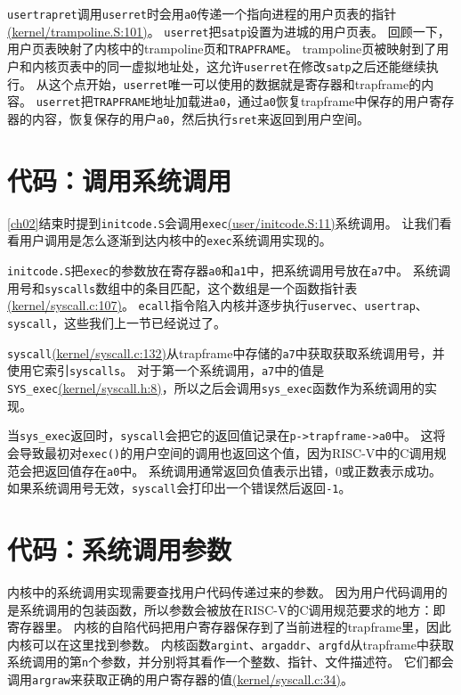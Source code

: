 \texttt{usertrapret}调用\texttt{userret}时会用\texttt{a0}传递一个指向进程的用户页表的指针\href{https://github.com/mit-pdos/xv6-riscv/blob/riscv//kernel/trampoline.S#L101}{(kernel/trampoline.S:101)}。
\texttt{userret}把\texttt{satp}设置为进城的用户页表。
回顾一下，用户页表映射了内核中的trampoline页和\texttt{TRAPFRAME}。
trampoline页被映射到了用户和内核页表中的同一虚拟地址处，这允许\texttt{userret}在修改\texttt{satp}之后还能继续执行。
从这个点开始，\texttt{userret}唯一可以使用的数据就是寄存器和trapframe的内容。
\texttt{userret}把\texttt{TRAPFRAME}地址加载进\texttt{a0}，通过\texttt{a0}恢复trapframe中保存的用户寄存器的内容，恢复保存的用户\texttt{a0}，然后执行\texttt{sret}来返回到用户空间。

\section{代码：调用系统调用}
\autoref{ch02}结束时提到\texttt{initcode.S}会调用\texttt{exec}\href{https://github.com/mit-pdos/xv6-riscv/blob/riscv//user/initcode.S#L11}{(user/initcode.S:11)}系统调用。
让我们看看用户调用是怎么逐渐到达内核中的\texttt{exec}系统调用实现的。

\texttt{initcode.S}把\texttt{exec}的参数放在寄存器\texttt{a0}和\texttt{a1}中，把系统调用号放在\texttt{a7}中。
系统调用号和\texttt{syscalls}数组中的条目匹配，这个数组是一个函数指针表\href{https://github.com/mit-pdos/xv6-riscv/blob/riscv//kernel/syscall.c#L107}{(kernel/syscall.c:107)}。
\texttt{ecall}指令陷入内核并逐步执行\texttt{uservec}、\texttt{usertrap}、\texttt{syscall}，这些我们上一节已经说过了。

\texttt{syscall}\href{https://github.com/mit-pdos/xv6-riscv/blob/riscv//kernel/syscall.c#L132}{(kernel/syscall.c:132)}从trapframe中存储的\texttt{a7}中获取获取系统调用号，并使用它索引\texttt{syscalls}。
对于第一个系统调用，\texttt{a7}中的值是\texttt{SYS\_exec}\href{https://github.com/mit-pdos/xv6-riscv/blob/riscv//kernel/syscall.h#L8}{(kernel/syscall.h:8)}，所以之后会调用\texttt{sys\_exec}函数作为系统调用的实现。

当\texttt{sys\_exec}返回时，\texttt{syscall}会把它的返回值记录在\texttt{p->trapframe->a0}中。
这将会导致最初对\texttt{exec()}的用户空间的调用也返回这个值，因为RISC-V中的C调用规范会把返回值存在\texttt{a0}中。
系统调用通常返回负值表示出错，0或正数表示成功。
如果系统调用号无效，\texttt{syscall}会打印出一个错误然后返回\texttt{-1}。

\section{代码：系统调用参数}
内核中的系统调用实现需要查找用户代码传递过来的参数。
因为用户代码调用的是系统调用的包装函数，所以参数会被放在RISC-V的C调用规范要求的地方：即寄存器里。
内核的自陷代码把用户寄存器保存到了当前进程的trapframe里，因此内核可以在这里找到参数。
内核函数\texttt{argint}、\texttt{argaddr}、\texttt{argfd}从trapframe中获取系统调用的第\texttt{n}个参数，并分别将其看作一个整数、指针、文件描述符。
它们都会调用\texttt{argraw}来获取正确的用户寄存器的值\href{https://github.com/mit-pdos/xv6-riscv/blob/riscv//kernel/syscall.c#L34}{(kernel/syscall.c:34)}。

